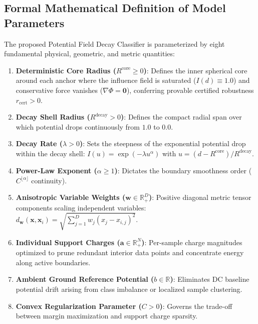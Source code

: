\documentclass[preprint,review,12pt]{elsarticle}
\begin{document}
\subsection{Formal Mathematical Definition of Model Parameters}
The proposed Potential Field Decay Classifier is parameterized by eight fundamental physical, geometric, and metric quantities:
\begin{enumerate}
    \item \textbf{Deterministic Core Radius ($R^{\mathrm{core}} \ge 0$)}: Defines the inner spherical core around each anchor where the influence field is saturated ($I(d) \equiv 1.0$) and conservative force vanishes ($\nabla \Phi = \mathbf{0}$), conferring provable certified robustness $r_{\mathrm{cert}} > 0$.
    \item \textbf{Decay Shell Radius ($R^{\mathrm{decay}} > 0$)}: Defines the compact radial span over which potential drops continuously from $1.0$ to $0.0$.
    \item \textbf{Decay Rate ($\lambda > 0$)}: Sets the steepness of the exponential potential drop within the decay shell: $I(u) = \exp(-\lambda u^\alpha)$ with $u = (d - R^{\mathrm{core}})/R^{\mathrm{decay}}$.
    \item \textbf{Power-Law Exponent ($\alpha \ge 1$)}: Dictates the boundary smoothness order ($C^{\lfloor\alpha\rfloor}$ continuity).
    \item \textbf{Anisotropic Variable Weights ($\mathbf{w} \in \mathbb{R}_+^D$)}: Positive diagonal metric tensor components scaling independent variables: $d_{\mathbf{w}}(\mathbf{x}, \mathbf{x}_i) = \sqrt{\sum_{j=1}^D w_j (x_j - x_{i,j})^2}$.
    \item \textbf{Individual Support Charges ($\mathbf{a} \in \mathbb{R}_+^N$)}: Per-sample charge magnitudes optimized to prune redundant interior data points and concentrate energy along active boundaries.
    \item \textbf{Ambient Ground Reference Potential ($b \in \mathbb{R}$)}: Eliminates DC baseline potential drift arising from class imbalance or localized sample clustering.
    \item \textbf{Convex Regularization Parameter ($C > 0$)}: Governs the trade-off between margin maximization and support charge sparsity.
\end{enumerate}
\end{document}
